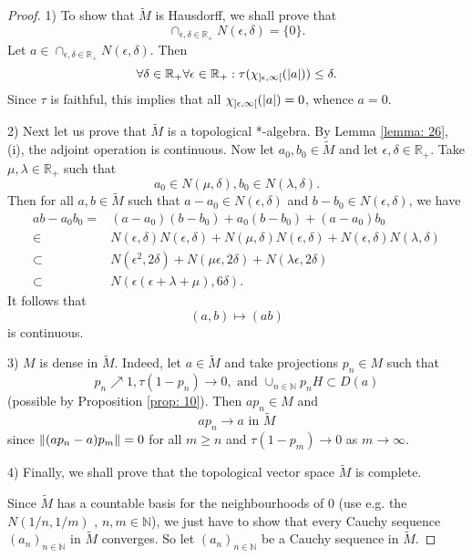\begin{proof}
    1) To show that $\widetilde{M}$ is Hausdorff, we shall prove that
    \[
        \cap_{\epsilon,\delta\in \mathbb{R}_+}N(\epsilon,\delta)=\{0\}.
    \]
    Let $a\in \cap_{\epsilon,\delta\in \mathbb{R}_+}N(\epsilon,\delta)$. Then
    \[
        \forall \delta\in \mathbb{R}_+ \forall \epsilon\in \mathbb{R}_+: \tau(\chi_{]\epsilon,\infty[}(\abs{a}))\leq \delta.
    \]
    Since $\tau$ is faithful, this implies that all $\chi_{]\epsilon,\infty[}(\abs{a})=0$, whence $a=0$.\par
    2) Next let us prove that $\widetilde{M}$ is a topological *-algebra. By Lemma \ref{lemma: 26}, (i), the adjoint operation is continuous. Now let $a_0,b_0\in \widetilde{M}$ and let $\epsilon,\delta\in \mathbb{R}_+$. Take $\mu,\lambda\in \mathbb{R}_+$ such that
    \[
        a_0\in N(\mu,\delta),b_0\in N(\lambda,\delta).
    \]
    Then for all $a,b \in\widetilde{M}$ such that $a-a_0 \in N(\epsilon,\delta)$ and $b-b_0 \in N(\epsilon,\delta)$, we have
    \[
        \begin{split}
            ab-a_0b_0=&(a-a_0)(b-b_0)+a_0(b-b_0)+(a-a_0)b_0\\
            \in &N(\epsilon,\delta)N(\epsilon,\delta)+N(\mu,\delta)N(\epsilon,\delta)+N(\epsilon,\delta)N(\lambda,\delta)\\
            \subset&N(\epsilon^2,2\delta)+N(\mu\epsilon,2\delta)+N(\lambda\epsilon,2\delta)\\
            \subset&N(\epsilon(\epsilon+\lambda+\mu),6\delta).
        \end{split}
    \]
    It follows that
    \[
        (a,b)\mapsto (ab)
    \]
    is continuous.\par
    3) $M$ is dense in $\widetilde{M}$. Indeed, let $a\in \widetilde{M}$ and take projections $p_n\in M$ such that
    \[
        p_n\nearrow 1, \tau(1-p_n)\to 0, \text{ and }\cup_{n\in \mathbb{N}}p_nH\subset D(a)
    \]
    (possible by Proposition \ref{prop: 10}). Then $ap_n \in M$ and
    \[
        ap_n\to a \text{ in } \widetilde{M}
    \]
    since $\norm{(ap_n-a)p_m}=0$ for all $m\geq n$ and $\tau(1-p_m)\to 0$ as $m\to \infty$.\par
    4) Finally, we shall prove that the topological vector space $\widetilde{M}$ is complete.\par
    Since $\widetilde{M}$ has a countable basis for the neighbourhoods of 0 (use e.g. the $N(1/n,1/m)$ , $n,m\in \mathbb{N}$), we just have to show that every Cauchy sequence $(a_n)_{n\in \mathbb{N}}$ in $\widetilde{M}$ converges. So let $(a_n)_{n\in \mathbb{N}}$ be a Cauchy sequence in $\widetilde{M}$.\par

\end{proof}
